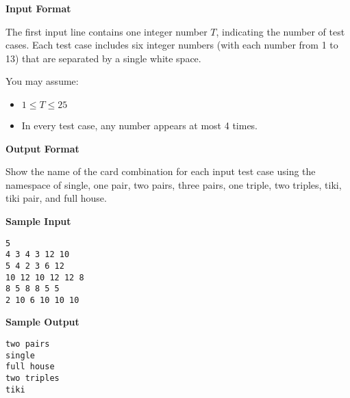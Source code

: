 \textbf{\large Input Format}

The first input line contains one integer number $T$, indicating the number of test
cases. Each test case includes six integer numbers (with each number from 1 to 13)
that are separated by a single white space.

You may assume:
\begin{itemize}
    \tightlist{}
    \item $1 \le T \le 25$
    \item In every test case, any number appears at most 4 times.
\end{itemize}


\textbf{\large Output Format}

Show the name of the card combination for each input test case using the
namespace of single, one pair, two pairs, three pairs, one triple, two triples, tiki, tiki
pair, and full house.

\textbf{\large Sample Input}

\begin{verbatim}
5
4 3 4 3 12 10
5 4 2 3 6 12
10 12 10 12 12 8
8 5 8 8 5 5
2 10 6 10 10 10
\end{verbatim}

\textbf{\large Sample Output}
\begin{verbatim}
two pairs
single
full house
two triples
tiki
\end{verbatim}
